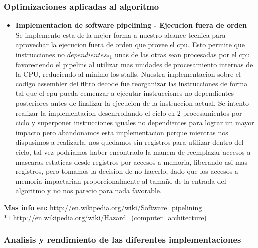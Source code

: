 \subsubsection{Optimizaciones aplicadas al algoritmo}
\begin{itemize}
    \item \textbf{Implementacion de software pipelining - Ejecucion fuera de orden}
    Se implemento esta de la mejor forma a nuestro alcance tecnica para aprovechar la ejecucion fuera de orden que provee el cpu. Esto permite que instrucciones no $dependientes_{*1}$ unas de las otras sean procesadas por el cpu favoreciendo el pipeline al utilizar mas unidades de procesamiento internas de la CPU, reduciendo al minimo los stalls. Nuestra implementacion sobre el codigo assembler del filtro decode fue reorganizar las instrucciones de forma tal que el cpu pueda comenzar a ejecutar instrucciones no dependientes posteriores antes de finalizar la ejecucion de la instruccion actual. Se intento realizar la implementacion desenrrollando el ciclo en 2 procesamientos por ciclo y superponer instrucciones iguales no dependientes para lograr un mayor impacto pero abandonamos esta implementacion porque mientras nos dispusimos a realizarla, nos quedamos sin registros \xmm{} para utilizar dentro del ciclo, tal vez podriamos haber encontrado la manera de reemplazar accesos a mascaras estaticas desde registros por accesos a memoria, liberando asi mas registros, pero tomamos la decision de no hacerlo, dado que los accesos a memoria impactarian proporcionalmente al tamaño de la entrada del algoritmo y no nos parecio para nada favorable.
\end{itemize}
\par
\bigskip
\textbf{Mas info en:} \url{http://en.wikipedia.org/wiki/Software_pipelining}\\
${*1} $ \url{http://en.wikipedia.org/wiki/Hazard_(computer_architecture)}

\subsubsection{Analisis y rendimiento de las diferentes implementaciones}

